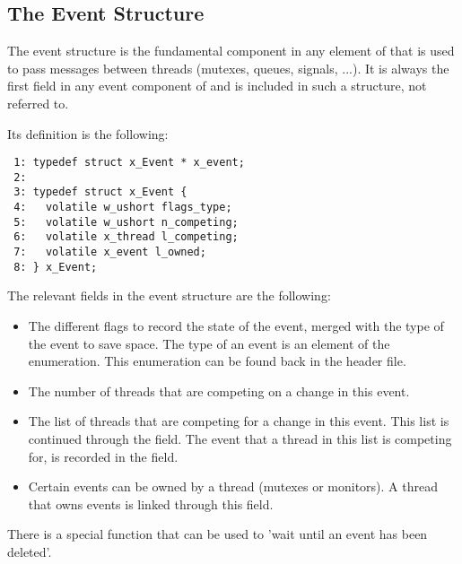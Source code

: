%
%

\subsection{The Event Structure}

The event structure is the fundamental component in any element of \oswald
that is used to pass messages between threads (mutexes, queues, signals,
...). It is always the first field in any event component of \oswald and is
included in such a structure, not referred to.

Its definition is the following:

\bcode
\begin{verbatim}
 1: typedef struct x_Event * x_event;
 2:
 3: typedef struct x_Event {
 4:   volatile w_ushort flags_type;
 5:   volatile w_ushort n_competing;
 6:   volatile x_thread l_competing;
 7:   volatile x_event l_owned;
 8: } x_Event;
\end{verbatim}
\ecode

The relevant fields in the event structure are the following:

\begin{itemize}
\item {} The different flags to record the
state of the event, merged with the type of the event to save space. The type of an event is an
element of the  enumeration. This enumeration can be found
back in the  header file.
\item {} The number of threads that
are competing on a change in this event.
\item {}
The list of threads that are competing for a change in this event. This list
is continued through the  field.
The event that a thread in this list is competing for, is recorded in the
 field.
\item {} Certain events can be owned by
a thread (mutexes or monitors). A thread that owns events is linked through
this field.
\end{itemize}

There is a special function that can be used to 'wait until an event has
been deleted'.


